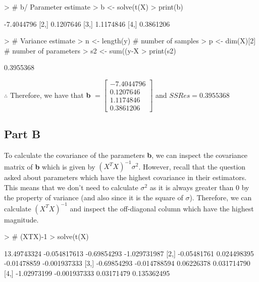 \documentclass{article}
\begin{document}
\begin{Schunk}
\begin{Sinput}
> # b/ Parameter estimate
> b <- solve(t(X) %
> print(b)
\end{Sinput}
\begin{Soutput}
           [,1]
[1,] -7.4044796
[2,]  0.1207646
[3,]  1.1174846
[4,]  0.3861206
\end{Soutput}
\begin{Sinput}
> # Variance estimate
> n <- length(y) # number of samples
> p <- dim(X)[2] # number of parameters
> s2 <- sum((y-X%
> print(s2)
\end{Sinput}
\begin{Soutput}
[1] 0.3955368
\end{Soutput}
\end{Schunk}

\noindent $\therefore$ Therefore, we have that \textbf{b} $= \begin{bmatrix}
    -7.4044796\\
    0.1207646\\
    1.1174846\\
    0.3861206
\end{bmatrix}$ and $SSRes = 0.3955368$

\subsection{Part B}
To calculate the covariance of the parameters \textbf{b}, we can inspect the covariance matrix of \textbf{b} which is given by $(X^TX)^{-1}\sigma^2$. However, recall that the question asked about parameters which have the highest covariance in their estimators. This means that we don't need to calculate $\sigma^2$ as it is always greater than 0 by the property of variance (and also since it is the square of $\sigma$). Therefore, we can calculate $(X^TX)^{-1}$ and inspect the off-diagonal column which have the highest magnitude.

\begin{Schunk}
\begin{Sinput}
> # (XTX)-1
> solve(t(X) %
\end{Sinput}
\begin{Soutput}
            [,1]         [,2]        [,3]         [,4]
[1,] 13.49743324 -0.054817613 -0.69854293 -1.029731987
[2,] -0.05481761  0.024498395 -0.01478859 -0.001937333
[3,] -0.69854293 -0.014788594  0.06226378  0.031714790
[4,] -1.02973199 -0.001937333  0.03171479  0.135362495
\end{Soutput}
\end{Schunk}
\end{document}
